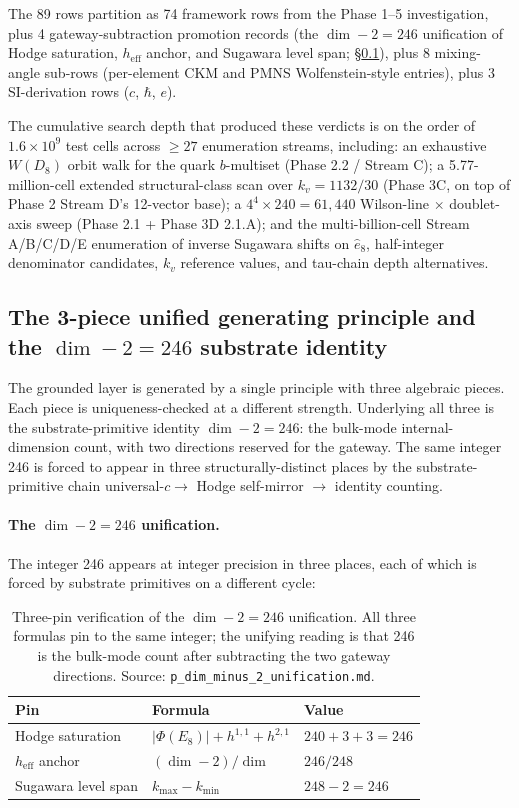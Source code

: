 ﻿\documentclass[reprint,amsmath,amssymb,aps,prd,longbibliography,floatfix]{revtex4-2}
\begin{document}
The 89 rows partition as 74 framework rows from the Phase 1--5
investigation, plus 4 gateway-subtraction promotion records (the
$\dim - 2 = 246$ unification of Hodge saturation, $h_\mathrm{eff}$
anchor, and Sugawara level span; \S\ref{sec:ugp}), plus 8 mixing-angle
sub-rows (per-element CKM and PMNS Wolfenstein-style entries), plus 3
SI-derivation rows ($c$, $\hbar$, $e$).

The cumulative search depth that produced these verdicts is on the
order of $1.6 \times 10^{9}$ test cells across $\geq 27$ enumeration
streams, including: an exhaustive $W(D_8)$ orbit walk for the quark
$b$-multiset (Phase 2.2 / Stream C); a 5.77-million-cell extended
structural-class scan over $k_v = 1132/30$ (Phase 3C, on top of Phase 2
Stream D's 12-vector base); a $4^4 \times 240 = 61{,}440$ Wilson-line
$\times$ doublet-axis sweep (Phase 2.1 + Phase 3D 2.1.A); and the
multi-billion-cell Stream A/B/C/D/E enumeration of inverse Sugawara
shifts on $\hat{e}_8$, half-integer denominator candidates, $k_v$
reference values, and tau-chain depth alternatives.

\subsection{The 3-piece unified generating principle and the
$\dim - 2 = 246$ substrate identity}
\label{sec:ugp}

The grounded layer is generated by a single principle with three
algebraic pieces. Each piece is uniqueness-checked at a different
strength. Underlying all three is the substrate-primitive identity
$\dim - 2 = 246$: the bulk-mode internal-dimension count, with two
directions reserved for the gateway. The same integer 246 is forced
to appear in three structurally-distinct places by the
substrate-primitive chain universal-$c \to$ Hodge self-mirror $\to$
identity counting.

\paragraph{The $\dim - 2 = 246$ unification.} The integer 246 appears
at integer precision in three places, each of which is forced by
substrate primitives on a different cycle:

\begin{table}[h]
\centering
\caption{Three-pin verification of the $\dim - 2 = 246$ unification.
All three formulas pin to the same integer; the unifying reading is
that 246 is the bulk-mode count after subtracting the two gateway
directions. Source: \texttt{p\_dim\_minus\_2\_unification.md}.}
\label{tab:dim-minus-2-unification}
\begin{tabular}{lll}
\toprule
Pin & Formula & Value \\
\midrule
Hodge saturation     & $|\Phi(E_8)| + h^{1,1} + h^{2,1}$ & $240 + 3 + 3 = 246$ \\
$h_\mathrm{eff}$ anchor & $(\dim - 2)/\dim$              & $246/248$ \\
Sugawara level span  & $k_\mathrm{max} - k_\mathrm{min}$ & $248 - 2 = 246$ \\
\bottomrule
\end{tabular}
\end{table}
\end{document}
